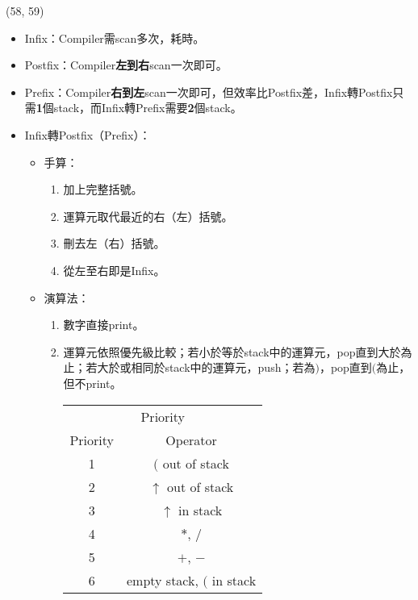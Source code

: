 \item \begin{theorem}{(58, 59)} \quad\quad
    \begin{itemize}
        \item Infix：Compiler需scan多次，耗時。
        \item Postfix：Compiler\textbf{左到右}scan一次即可。
        \item Prefix：Compiler\textbf{右到左}scan一次即可，但效率比Postfix差，Infix轉Postfix只需\textbf{1}個stack，而Infix轉Prefix需要\textbf{2}個stack。
        \item Infix轉Postfix（Prefix）：\begin{itemize}
            \item 手算：\begin{enumerate}
                \item 加上完整括號。
                \item 運算元取代最近的右（左）括號。
                \item 刪去左（右）括號。
                \item 從左至右即是Infix。
            \end{enumerate}
            \item 演算法：\begin{enumerate}
                \item 數字直接print。
                \item 運算元依照優先級比較；若小於等於stack中的運算元，pop直到大於為止；若大於或相同於stack中的運算元，push；若為$)$，pop直到$($為止，但不print。
                \begin{table}[H]
                    \centering
                    \begin{tabular}{|c|c|}
                        \hline
                        \multicolumn{2}{|c|}{Priority} \\
                        \Xhline{3\arrayrulewidth}
                        Priority & Operator \\
                        \Xhline{2\arrayrulewidth}
                        1 & $($ out of stack \\
                        \hline
                        2 & $\uparrow$ out of stack \\
                        \hline
                        3 & $\uparrow$ in stack \\
                        \hline
                        4 & $*$, $/$ \\
                        \hline
                        5 & $+$, $-$ \\
                        \hline
                        6 & empty stack, $($ in stack \\
                        \hline
                    \end{tabular}
                \end{table}
            \end{enumerate}
        \end{itemize}
    \end{itemize}
\end{theorem}

